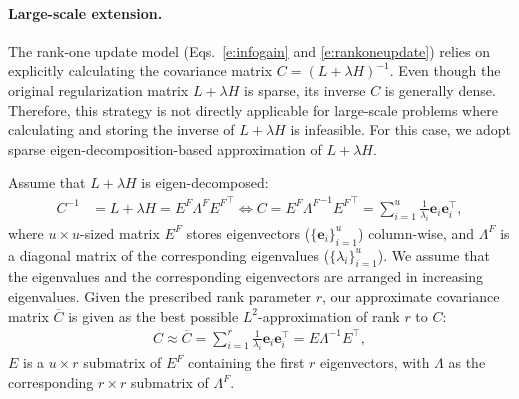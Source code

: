 \documentclass{article}
\newcommand{\mbe}{\mathbf{e}}
\begin{document}
\paragraph{Large-scale extension.}
The rank-one update model (Eqs.~\ref{e:infogain} and \ref{e:rankoneupdate}) relies on explicitly calculating the covariance matrix $C=(L+\lambda H)^{-1}$. Even though the original regularization matrix $L+\lambda H$ is sparse, its inverse $C$ is generally dense. Therefore, this strategy is not directly applicable for large-scale problems where calculating and storing the inverse of $L+\lambda H$ is infeasible. For this case, we adopt sparse eigen-decomposition-based approximation of $L+\lambda H$.

Assume that $L+\lambda H$ is eigen-decomposed:
\begin{align}
C^{-1}&=L+\lambda H= E^F\Lambda^F {E^F}^\top\nonumber \Leftrightarrow C= E^F{\Lambda^F}^{-1} {E^F}^\top=\sum_{i=1}^u \frac{1}{\lambda_i}\mbe_i\mbe_i^\top,\nonumber
\label{e:approx}
\end{align}
where $u\times u$-sized matrix $E^F$ stores eigenvectors ($\{\mbe_i\}_{i=1}^u$) column-wise, and $\Lambda^F$ is a diagonal matrix of the corresponding eigenvalues ($\{\lambda_i\}_{i=1}^u$). We assume that the eigenvalues and the corresponding eigenvectors are arranged in increasing eigenvalues. Given the prescribed rank parameter $r$, our approximate covariance matrix $\overline{C}$ is given as the best possible $L^2$-approximation of rank $r$ to $C$:
\begin{align}
C\approx\overline{C}= \sum_{i=1}^r \frac{1}{\lambda_i}\mbe_i\mbe_i^\top=E \Lambda^{-1} E^\top,
\end{align}
$E$ is a $u\times r$ submatrix of $E^F$ containing the first $r$ eigenvectors, with $\Lambda$ as the corresponding $r\times r$ submatrix of $\Lambda^F$.
\end{document}
